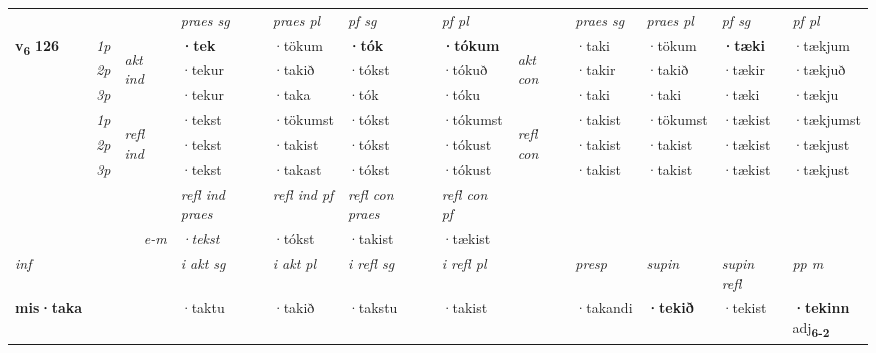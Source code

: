 \begin{longtable}[l]{X>{\footnotesize\itshape}llXXXXlXXXX}
\midrule

 & &   & \textit{praes sg}  & \textit{praes pl}    & \textit{ pf sg} & \textit{pf pl} & & \textit{praes sg}  & \textit{praes pl}    & \textit{pf sg} & \textit{pf pl }  \\ \cmidrule{4-7} \cmidrule{9-12}
 \multirow{2}{*}{{{\textbf{v{\textsubscript{6}}} \Large{\textbf{126}}}}}  & 1p & \multirow{3}{*}{\begin{turn}{90}\textit{akt ind}\end{turn}} & \textbf{·tek} & ·tökum & \textbf{·tók} & \textbf{·tókum} & \multirow{3}{*}{\begin{turn}{90}\textit{akt con}\end{turn}} &·taki & ·tökum & \textbf{·tæki} & ·tækjum\\*
 & 2p &  &  ·tekur  & ·takið & ·tókst & ·tókuð & & ·takir & ·takið & ·tækir & ·tækjuð \\*
 & 3p &  & ·tekur & ·taka & ·tók & ·tóku & & ·taki & ·taki& ·tæki & ·tækju \\*
\cmidrule{4-7} \cmidrule{9-12}
 & 1p & \multirow{3}{*}{\begin{turn}{90}\textit{refl ind}\end{turn}}  & ·tekst & ·tökumst & ·tókst & ·tókumst & \multirow{3}{*}{\begin{turn}{90}\textit{refl con}\end{turn}}  &·takist & ·tökumst & ·tækist & ·tækjumst \\*
 & 2p &  & ·tekst & ·takist & ·tókst & ·tókust & &·takist & ·takist & ·tækist & ·tækjust \\*
 & 3p  & & ·tekst & ·takast & ·tókst & ·tókust & & ·takist & ·takist& ·tækist & ·tækjust \\*
\cmidrule{4-7} \cmidrule{9-12}

 & && \textit{refl ind praes} & \textit{refl ind pf} & \textit{refl con praes} & \textit{refl con pf} \\*
\multicolumn{3}{r}{\textit{e-m}}& ·tekst & ·tókst & ·takist & ·tækist \\*

\cmidrule{4-7}
   {\textit{inf}} & &  & \textit{i akt sg} & \textit{i akt pl} & \textit{i refl sg} & \textit{i refl pl} && \textit{presp} & \textit{supin} & \textit{supin refl} & \textit{pp m} \\*
  {\textbf{mis\allowbreak ·taka}} & && ·taktu  & ·takið & ·takstu & ·takist && ·takandi &  \textbf{·tekið} & ·tekist & \specialcell{\textbf{·tekinn} \\ adj\textbf{\textsubscript{6-2}}} \\*


\end{longtable}
